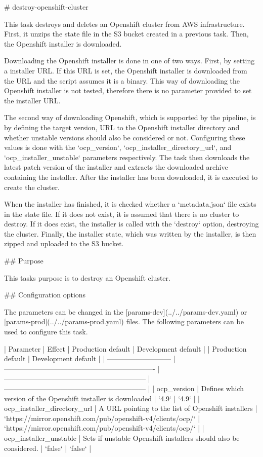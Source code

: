 # destroy-openshift-cluster

This task destroys and deletes an Openshift cluster from AWS infrastructure.
First, it unzips the state file in the S3 bucket created in a previous task.
Then, the Openshift installer is downloaded.

Downloading the Openshift installer is done in one of two ways.
First, by setting a installer URL.
If this URL is set, the Openshift installer is downloaded from the URL and the script assumes it is a binary.
This way of downloading the Openshift installer is not tested, therefore there is no parameter provided to set the installer URL.

The second way of downloading Openshift, which is supported by the pipeline, is by defining the target version, URL to the Openshift installer directory and whether unstable versions should also be considered or not.
Configuring these values is done with the `{ocp_version}`, `{ocp_installer_directory_url}`, and `{ocp_installer_unstable}` parameters respectively.
The task then downloads the latest patch version of the installer and extracts the downloaded archive containing the installer.
After the installer has been downloaded, it is executed to create the cluster.

When the installer has finished, it is checked whether a `metadata.json` file exists in the state file.
If it does not exist, it is assumed that there is no cluster to destroy.
If it does exist, the installer is called with the `destroy` option, destroying the cluster.
Finally, the installer state, which was written by the installer, is then zipped and uploaded to the S3 bucket.

## Purpose

This tasks purpose is to destroy an Openshift cluster.

## Configuration options

The parameters can be changed in the [params-dev](../../params-dev.yaml) or [params-prod](../../params-prod.yaml) files.
The following parameters can be used to configure this task.

| Parameter                   | Effect                                                           | Production default                                           | Development default                                          |  | Production default | Development default |
| --------------------------- | ---------------------------------------------------------------- | ------------------------------------------------------------ | ------------------------------------------------------------ |
| ocp_version                 | Defines which version of the Openshift installer is downloaded   | `4.9`                                                        | `4.9`                                                        |
| ocp_installer_directory_url | A URL pointing to the list of Openshift installers               | `https://mirror.openshift.com/pub/openshift-v4/clients/ocp/` | `https://mirror.openshift.com/pub/openshift-v4/clients/ocp/` |
| ocp_installer_unstable      | Sets if unstable Openshift installers should also be considered. | `false`                                                      | `false`                                                      |

